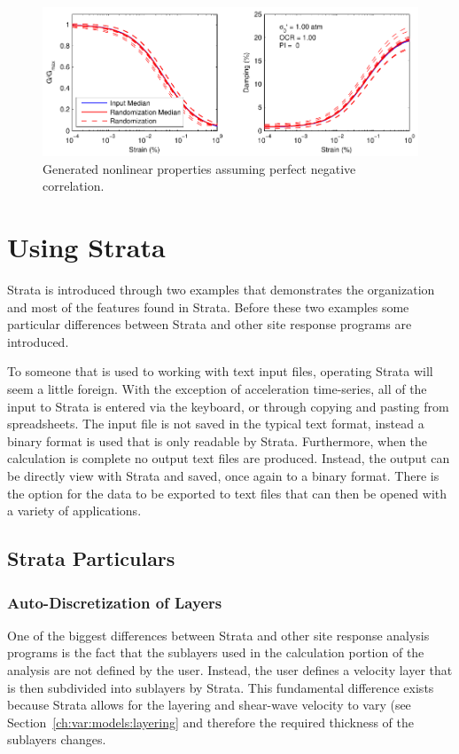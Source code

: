\documentclass[11pt]{report}
\begin{document}
\begin{figure}[tp]
  \begin{center}
	\includegraphics[width=\linewidth]{figures/rand/nlProps.pdf}
  \end{center}
  \caption{Generated nonlinear properties assuming perfect negative correlation.}
  \label{fig:rand:nlProps}
\end{figure}

\chapter{Using Strata}
Strata is introduced through two examples that demonstrates the organization and most of the
features found in Strata. Before these two examples some particular differences between Strata and
other site response programs are introduced. 

To someone that is used to working with text input files, operating Strata will seem a little
foreign.  With the exception of acceleration time-series, all of the input to Strata is
entered via the keyboard, or through copying and pasting from spreadsheets.  The input file is not
saved in the typical text format, instead a binary format is used that is only readable by Strata.
Furthermore, when the calculation is complete no output text files are produced.  Instead, the
output can be directly view with Strata and saved, once again to a binary format.  There is the
option for the data to be exported to text files that can then be opened with a variety of
applications.

\section{Strata Particulars}
\subsection{Auto-Discretization of Layers}
One of the biggest differences between Strata and other site response analysis programs is the fact
that the sublayers used in the calculation portion of the analysis are not defined by the user.
Instead, the user defines a velocity layer that is then subdivided into sublayers by Strata.  This
fundamental difference exists because Strata allows for the layering and shear-wave velocity to vary
(see Section~\ref{ch:var:models:layering} and therefore the required thickness of the sublayers
changes.
\end{document}
